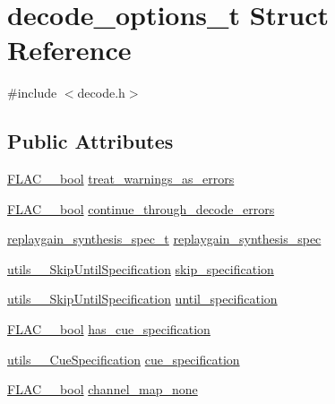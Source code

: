 \hypertarget{structdecode__options__t}{}\section{decode\+\_\+options\+\_\+t Struct Reference}
\label{structdecode__options__t}


{\ttfamily \#include $<$decode.\+h$>$}

\subsection*{Public Attributes}
\begin{DoxyCompactItemize}
\item 
\hyperlink{ordinals_8h_a95103469f1cbd78b8cf250194985b34e}{F\+L\+A\+C\+\_\+\+\_\+bool} \hyperlink{structdecode__options__t_abae2f012f8191971a2f21f1a4bd44422}{treat\+\_\+warnings\+\_\+as\+\_\+errors}
\item 
\hyperlink{ordinals_8h_a95103469f1cbd78b8cf250194985b34e}{F\+L\+A\+C\+\_\+\+\_\+bool} \hyperlink{structdecode__options__t_a39ce3cd359230b6fde659bf224b5a5d8}{continue\+\_\+through\+\_\+decode\+\_\+errors}
\item 
\hyperlink{structreplaygain__synthesis__spec__t}{replaygain\+\_\+synthesis\+\_\+spec\+\_\+t} \hyperlink{structdecode__options__t_a68835bb5d67061b449de74d96494aa57}{replaygain\+\_\+synthesis\+\_\+spec}
\item 
\hyperlink{structutils_____skip_until_specification}{utils\+\_\+\+\_\+\+Skip\+Until\+Specification} \hyperlink{structdecode__options__t_ae0c5755b752eadb15f59d3ef9b6bb0f2}{skip\+\_\+specification}
\item 
\hyperlink{structutils_____skip_until_specification}{utils\+\_\+\+\_\+\+Skip\+Until\+Specification} \hyperlink{structdecode__options__t_adf0451f0eb4d260bd5e03948900626fa}{until\+\_\+specification}
\item 
\hyperlink{ordinals_8h_a95103469f1cbd78b8cf250194985b34e}{F\+L\+A\+C\+\_\+\+\_\+bool} \hyperlink{structdecode__options__t_a090ac01d144b0c8b0ae24de42b5ec100}{has\+\_\+cue\+\_\+specification}
\item 
\hyperlink{structutils_____cue_specification}{utils\+\_\+\+\_\+\+Cue\+Specification} \hyperlink{structdecode__options__t_a5e0da15d03fb6b717eb62ea41048d195}{cue\+\_\+specification}
\item 
\hyperlink{ordinals_8h_a95103469f1cbd78b8cf250194985b34e}{F\+L\+A\+C\+\_\+\+\_\+bool} \hyperlink{structdecode__options__t_ada3f1ff7db4481f8ce2cbca8499b271d}{channel\+\_\+map\+\_\+none}

\end{DoxyCompactItemize}
